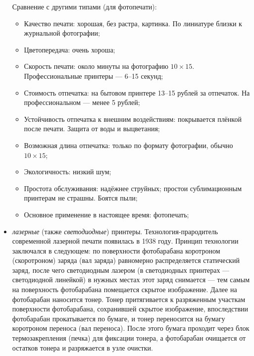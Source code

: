 \begin{itemize}
 Сравнение с другими типами (для фотопечати):
 \begin{itemize}
  \item Качество печати: хорошая, без растра, картинка. По линиатуре близки к журнальной фотографии;
  \item Цветопередача: очень хороша;
  \item Скорость печати: около минуты на фотографию $10\times15$. Профессиональные принтеры --- 6--15 секунд;
  \item Стоимость отпечатка: на бытовом принтере 13--15 рублей за отпечаток. На профессиональном --- менее 5 рублей;
  \item Устойчивость отпечатка к внешним воздействиям: покрывается плёнкой после печати. Защита от воды и выцветания;
  \item Возможная длина отпечатка: только по формату фотографии, обычно $10\times15$;
  \item Экологичность: низкий шум;
  \item Простота обслуживания: надёжнее струйных; простои сублимационным принтерам не страшны. Боятся пыли;
  \item Основное применение в настоящее время: фотопечать; 
 \end{itemize}
 \item \emph{лазерные} (также \emph{светодиодные}) принтеры. Тех\-но\-ло\-гия-пра\-ро\-ди\-тель современной лазерной печати появилась в 1938 году. Принцип технологии заключался в следующем: по поверхности фотобарабана коротроном (скоротроном) заряда (вал заряда) равномерно распределяется статический заряд, после чего светодиодным лазером (в светодиодных принтерах --- светодиодной линейкой) в нужных местах этот заряд снимается --- тем самым на поверхность фотобарабана помещается скрытое изображение. Далее на фотобарабан наносится тонер. Тонер притягивается к разряженным участкам поверхности фотобарабана, сохранившей скрытое изображение, впоследствии фотобарабан прокатывается по бумаге, и тонер переносится на бумагу коротроном переноса (вал переноса). После этого бумага проходит через блок термозакрепления (печка) для фиксации тонера, а фотобарабан очищается от остатков тонера и разряжается в узле очистки.
 

\end{itemize}
